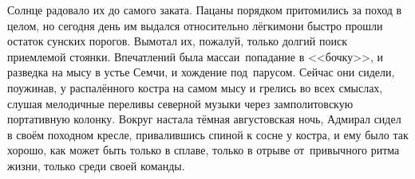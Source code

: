 \vspace{0.4cm}
\myldots{}Солнце радовало их до самого заката. Пацаны порядком притомились за поход в целом, но сегодня день им выдался относительно лёгким\mdash они быстро прошли остаток сунских порогов. Вымотал их, пожалуй, только долгий поиск приемлемой стоянки. Впечатлений была масса\mdash и~попадание в <<бочку>>, и разведка на мысу в устье Семчи, и хождение под~парусом. Сейчас они сидели, поужинав, у распалённого костра на самом мысу и грелись во всех смыслах, слушая мелодичные переливы северной музыки через замполитовскую портативную колонку. Вокруг настала тёмная августовская ночь, Адмирал сидел в своём походном кресле, привалившись спиной к сосне у костра, и ему было так хорошо, как может быть только в сплаве, только в отрыве от~привычного ритма жизни, только среди своей команды.








\begin{center}
\end{center}
